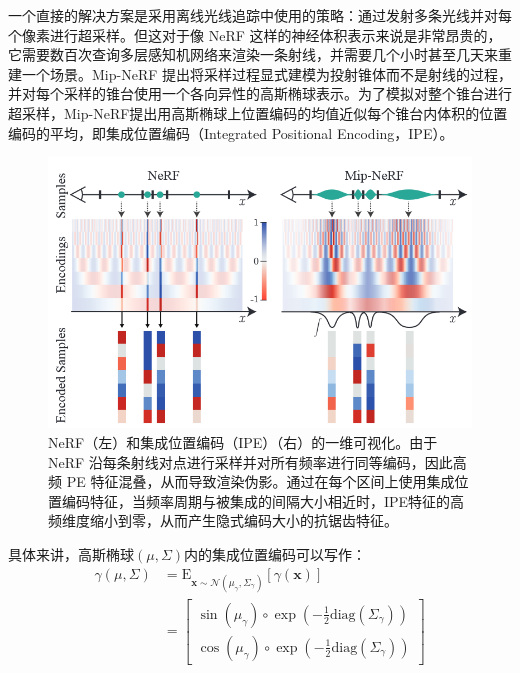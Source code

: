 一个直接的解决方案是采用离线光线追踪中使用的策略：通过发射多条光线并对每个像素进行超采样。但这对于像 NeRF 这样的神经体积表示来说是非常昂贵的，它需要数百次查询多层感知机网络来渲染一条射线，并需要几个小时甚至几天来重建一个场景。Mip-NeRF \cite{barron_mip-nerf_2021}提出将采样过程显式建模为投射锥体而不是射线的过程，并对每个采样的锥台使用一个各向异性的高斯椭球表示。为了模拟对整个锥台进行超采样，Mip-NeRF提出用高斯椭球上位置编码的均值近似每个锥台内体积的位置编码的平均，即集成位置编码（Integrated Positional Encoding，IPE）。
\begin{figure}[h]
    \centering
    \includegraphics[width=\textwidth]{undergraduate-thesis/images/related-work/mipnerf-encoding.png}
    \caption{NeRF（左）和集成位置编码（IPE）（右）的一维可视化。由于 NeRF 沿每条射线对点进行采样并对所有频率进行同等编码，因此高频 PE 特征混叠，从而导致渲染伪影。通过在每个区间上使用集成位置编码特征，当频率周期与被集成的间隔大小相近时，IPE特征的高频维度缩小到零，从而产生隐式编码大小的抗锯齿特征。\cite{barron_mip-nerf_2021}}
    \label{fig:related-work mip-nerf encoding}
\end{figure}

具体来讲，高斯椭球$(\mu,\Sigma)$内的集成位置编码可以写作：
\begin{align}
    \gamma(\mu,\Sigma) &= \text{E}_{\mathbf{x}\sim\mathcal{N}(\mu_\gamma,\Sigma_\gamma)}[\gamma(\mathbf{x})] \\
    &= \begin{bmatrix}
    \sin(\mu_\gamma)\circ\exp(-\frac{1}{2}\text{diag}(\Sigma_\gamma))\\
    \cos(\mu_\gamma)\circ\exp(-\frac{1}{2}\text{diag}(\Sigma_\gamma))
    \end{bmatrix}
\end{align}

